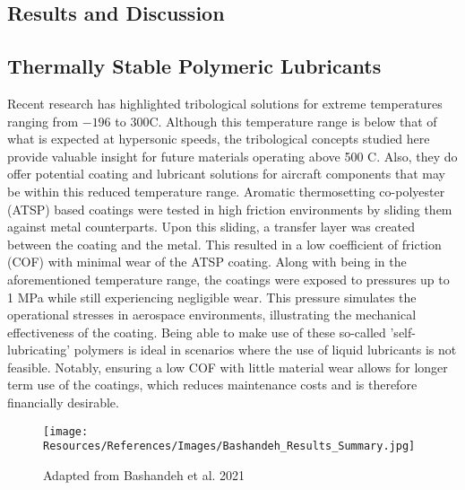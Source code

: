 \documentclass[12pt]{article}
\begin{document}
\begin{multicols}{2}
\section{Results and Discussion}

\subsection{Thermally Stable Polymeric Lubricants}

\indent Recent research has highlighted tribological solutions for extreme temperatures ranging from $-196$ to $300$\degree C. Although this temperature range is below that of what is expected at hypersonic speeds, the tribological concepts studied here provide valuable insight for future materials operating above 500 \degree C. Also, they do offer potential coating and lubricant solutions for aircraft components that may be within this reduced temperature range. Aromatic thermosetting co-polyester (ATSP) based coatings were tested in high friction environments by sliding them against metal counterparts. Upon this sliding, a transfer layer was created between the coating and the metal. This resulted in a low coefficient of friction (COF) with minimal wear of the ATSP coating. Along with being in the aforementioned temperature range, the coatings were exposed to pressures up to 1 MPa while still experiencing negligible wear. \citep{Bashandeh2021} This pressure simulates the operational stresses in aerospace environments, illustrating the mechanical effectiveness of the coating. Being able to make use of these so-called 'self-lubricating' polymers is ideal in scenarios where the use of liquid lubricants is not feasible. Notably, ensuring a low COF with little material wear allows for longer term use of the coatings, which reduces maintenance costs and is therefore financially desirable.

\begin{figure}[H]
    \centering
    \texttt{[image: Resources/References/Images/Bashandeh\_Results\_Summary.jpg]}
    \caption{\scriptsize{Adapted from Bashandeh et al. 2021 \citep{Bashandeh2021}}}
    \label{fig:Bashandeh-Summary}
\end{figure}


\end{multicols}
\end{document}
